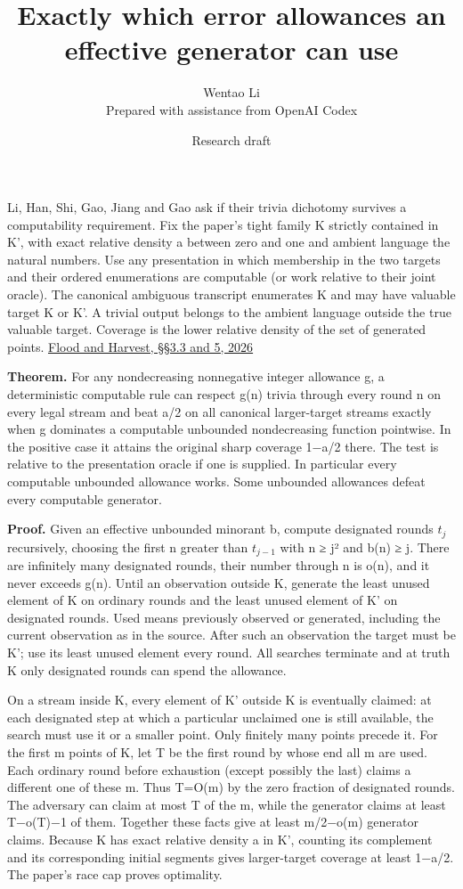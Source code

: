 \documentclass[11pt]{article}
\title{Exactly which error allowances an effective generator can use}
\author{Wentao Li\\{\small Prepared with assistance from OpenAI Codex}}
\date{Research draft}
\begin{document}
\maketitle
Li, Han, Shi, Gao, Jiang and Gao ask if their trivia dichotomy survives a computability requirement. Fix the paper's tight family K strictly contained in K', with exact relative density a between zero and one and ambient language the natural numbers. Use any presentation in which membership in the two targets and their ordered enumerations are computable (or work relative to their joint oracle). The canonical ambiguous transcript enumerates K and may have valuable target K or K'. A trivial output belongs to the ambient language outside the true valuable target. Coverage is the lower relative density of the set of generated points. \href{https://arxiv.org/abs/2606.14688v1}{Flood and Harvest, §§3.3 and 5, 2026}

\textbf{Theorem.} For any nondecreasing nonnegative integer allowance g, a deterministic computable rule can respect g(n) trivia through every round n on every legal stream and beat a/2 on all canonical larger-target streams exactly when g dominates a computable unbounded nondecreasing function pointwise. In the positive case it attains the original sharp coverage 1−a/2 there. The test is relative to the presentation oracle if one is supplied. In particular every computable unbounded allowance works. Some unbounded allowances defeat every computable generator.

\textbf{Proof.} Given an effective unbounded minorant b, compute designated rounds \(t_j\) recursively, choosing the first n greater than \(t_{j-1}\) with n ≥ j² and b(n) ≥ j. There are infinitely many designated rounds, their number through n is o(n), and it never exceeds g(n). Until an observation outside K, generate the least unused element of K on ordinary rounds and the least unused element of K' on designated rounds. Used means previously observed or generated, including the current observation as in the source. After such an observation the target must be K'; use its least unused element every round. All searches terminate and at truth K only designated rounds can spend the allowance.

On a stream inside K, every element of K' outside K is eventually claimed: at each designated step at which a particular unclaimed one is still available, the search must use it or a smaller point. Only finitely many points precede it. For the first m points of K, let T be the first round by whose end all m are used. Each ordinary round before exhaustion (except possibly the last) claims a different one of these m. Thus T=O(m) by the zero fraction of designated rounds. The adversary can claim at most T of the m, while the generator claims at least T−o(T)−1 of them. Together these facts give at least m/2−o(m) generator claims. Because K has exact relative density a in K', counting its complement and its corresponding initial segments gives larger-target coverage at least 1−a/2. The paper's race cap proves optimality.
\end{document}
